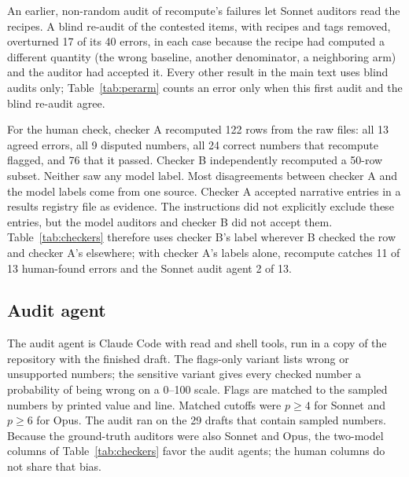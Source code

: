 An earlier, non-random audit of recompute's failures let Sonnet auditors read the recipes. A blind re-audit of the
contested items, with recipes and tags removed, overturned 17 of its 40 errors, in each case because the recipe had
computed a different quantity (the wrong baseline, another denominator, a neighboring arm) and the auditor had
accepted it. Every other result in the main text uses blind audits only; Table~\ref{tab:perarm} counts an error
only when this first audit and the blind re-audit agree.

For the human check, checker A recomputed 122 rows from the raw files: all 13 agreed errors, all 9 disputed numbers,
all 24 correct numbers that recompute flagged, and 76 that it passed. Checker B independently recomputed a 50-row
subset. Neither saw any model label. Most disagreements between checker A and the model labels come from one source.
Checker A accepted narrative entries in a results registry file as evidence. The instructions did not explicitly
exclude these entries, but the model auditors and checker B did not accept them. Table~\ref{tab:checkers} therefore uses checker B's
label wherever B checked the row and checker A's elsewhere; with checker A's labels alone, recompute catches 11 of 13
human-found errors and the Sonnet audit agent 2 of 13.

\subsection{Audit agent}
\label{app:auditagent}

The audit agent is Claude Code with read and shell tools, run in a copy of the repository with the finished draft.
The flags-only variant lists wrong or unsupported numbers; the sensitive variant gives every checked number a
probability of being wrong on a 0--100 scale. Flags are matched to the sampled numbers by printed value and line.
Matched cutoffs were $p \ge 4$ for Sonnet and $p \ge 6$ for Opus. The audit ran on the 29 drafts that contain sampled
numbers. Because the ground-truth auditors were also Sonnet and Opus, the two-model columns of
Table~\ref{tab:checkers} favor the audit agents; the human columns do not share that bias.

